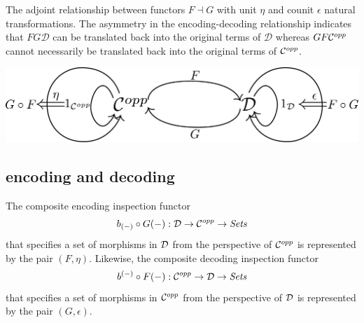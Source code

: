 

\begin{frame}
The adjoint relationship between functors $F \dashv G$ with unit $\eta$ and counit $\epsilon$ natural transformations. The asymmetry in the encoding-decoding relationship indicates that $FG \mathcal{D}$ can be translated back into the original terms of $\mathcal{D}$ whereas $GF {\mathcal C}^{opp}$ cannot necessarily be translated back into the original terms of ${\mathcal C}^{opp}$.
\begin{center}
\includegraphics[width=0.9\framewidth]{fig/adjunction.pdf}
\end{center}
\end{frame}

\subsection{encoding and decoding}
\begin{frame}
The composite encoding inspection functor 
$$
b_{(-)} \circ G(-): \mathcal{D} \rightarrow {\mathcal C}^{opp} \rightarrow \textit{Sets}
$$
that specifies a set of morphisms in ${\mathcal D}$ from the perspective of ${\mathcal C}^{opp}$ is represented by the pair $(F,\eta)$. Likewise, the composite decoding inspection functor 
$$
b^{(-)} \circ F(-): {\mathcal C}^{opp} \rightarrow {\mathcal D} \rightarrow \textit{Sets}
$$
that specifies a set of morphisms in ${\mathcal C}^{opp}$ from the perspective of ${\mathcal D}$ is represented by the pair $(G,\epsilon)$.
\end{frame}

